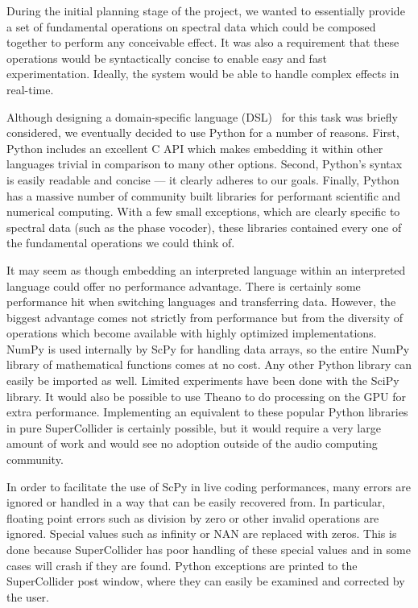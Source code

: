 \documentclass{article}
\begin{document}
During the initial planning stage of the project, we wanted to essentially provide a set of
fundamental operations on spectral data which could be composed together to perform any conceivable
effect. It was also a requirement that these operations would be syntactically concise to enable
easy and fast experimentation. Ideally, the system would be able to handle complex effects in
real-time.

Although designing a domain-specific language (DSL)~\cite{van2000domain} for this task was briefly
considered, we eventually decided to use Python for a number of reasons. First, Python includes an
excellent C API which makes embedding it within other languages trivial in comparison to many other
options. Second, Python's syntax is easily readable and concise --- it clearly adheres to our
goals. Finally, Python has a massive number of community built libraries for performant scientific
and numerical computing. With a few small exceptions, which are clearly specific to spectral data
(such as the phase vocoder), these libraries contained every one of the fundamental operations we
could think of.

It may seem as though embedding an interpreted language within an interpreted language could offer
no performance advantage. There is certainly some performance hit when switching languages and
transferring data. However, the biggest advantage comes not strictly from performance but from the
diversity of operations which become available with highly optimized implementations. NumPy is used
internally by ScPy for handling data arrays, so the entire NumPy library of mathematical functions
comes at no cost. Any other Python library can easily be imported as well. Limited experiments
have been done with the SciPy library. It would also be possible to use Theano to do processing on
the GPU for extra performance. Implementing an equivalent to these popular Python libraries in pure
SuperCollider is certainly possible, but it would require a very large amount of work and would see
no adoption outside of the audio computing community.

In order to facilitate the use of ScPy in live coding performances, many errors are ignored or
handled in a way that can be easily recovered from. In particular, floating point errors such as
division by zero or other invalid operations are ignored. Special values such as infinity or NAN
are replaced with zeros. This is done because SuperCollider has poor handling of these special
values and in some cases will crash if they are found. Python exceptions are printed to the
SuperCollider post window, where they can easily be examined and corrected by the user.
\end{document}
